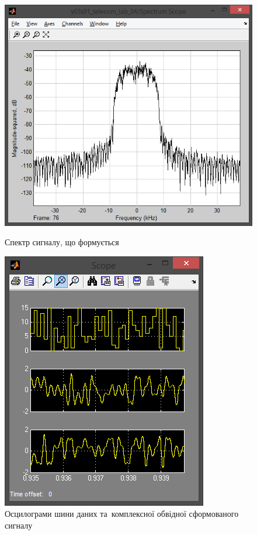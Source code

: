 \documentclass[
	a4paper,
	oneside,
	BCOR = 10mm,
	DIV = 12,
	12pt,
	headings = normal,
]{scrartcl}
\begin{document}
				\begin{figure}[!htbp]
					\begin{minipage}[t]{0.5\textwidth - 0.5em}
						\centering
						\includegraphics[height = 8\baselineskip]{../01-solution/rolloff-0p8-spectrum-scope.png}
						\caption{Спектр сигналу, що формується}
						\label{fig:rolloff-0p8-spectrum-scope}
					\end{minipage}\hspace{1em}%
					\begin{minipage}[t]{0.5\textwidth - 0.5em}
						\centering
						\includegraphics[height = 8\baselineskip]{../01-solution/rolloff-0p8-scope.png}
						\caption{Осцилограми шини даних та~комплексної обвідної сформованого сигналу}
						\label{fig:rolloff-0p8-scope}
					\end{minipage}%
				\end{figure}
\end{document}
